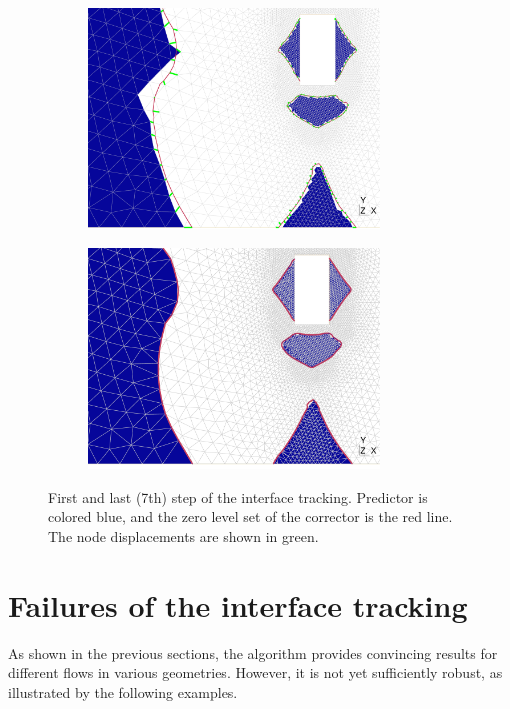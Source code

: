 \documentclass[11 pt]{report}
\begin{document}
\begin{figure}
    \centering
    \begin{subfigure}[t]{\textwidth}
        \centering
        \includegraphics[width=0.85\textwidth]{../figures/cylinder_mesh.pdf}
    \end{subfigure}\vspace{6pt}
    \begin{subfigure}[t]{\textwidth}
        \centering
        \includegraphics[width=0.85\textwidth]{../figures/cylinder_mesh_2.pdf}
    \end{subfigure}
    \caption{First and last (7th) step of the interface tracking. Predictor is colored blue, and the zero level set of the corrector is the red line. The node displacements are shown in green.}
    \label{fig:cylinderTracking}
\end{figure}

\section{Failures of the interface tracking}
\label{sec:failures}
As shown in the previous sections, the algorithm provides convincing results for different flows in various geometries. However, it is not yet sufficiently robust, as illustrated by the following examples.
\end{document}
